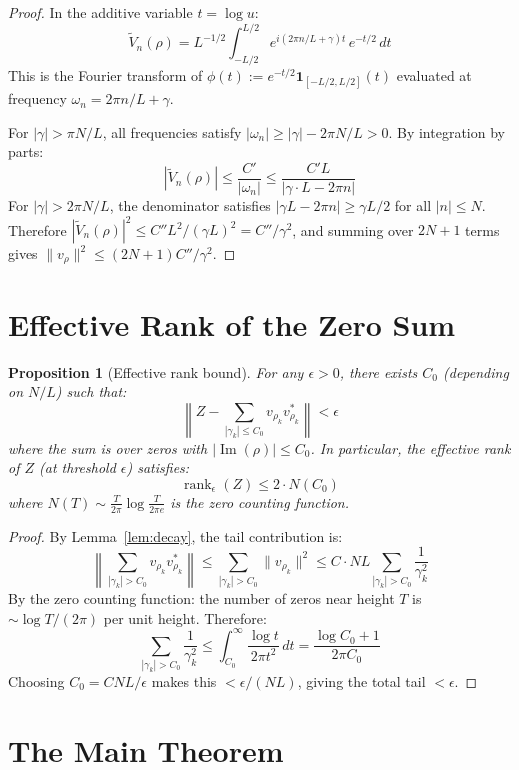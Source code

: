 \documentclass[11pt]{article}
\newtheorem{proposition}{Proposition}
\begin{document}
\begin{proof}
In the additive variable $t = \log u$:
\[
\tilde{V}_n(\rho) = L^{-1/2} \int_{-L/2}^{L/2} e^{i(2\pi n/L + \gamma)t}\, e^{-t/2}\, dt
\]
This is the Fourier transform of $\phi(t) := e^{-t/2}\mathbf{1}_{[-L/2,L/2]}(t)$ evaluated at frequency $\omega_n = 2\pi n/L + \gamma$.

For $|\gamma| > \pi N/L$, all frequencies satisfy $|\omega_n| \geq |\gamma| - 2\pi N/L > 0$. By integration by parts:
\[
|\tilde{V}_n(\rho)| \leq \frac{C'}{|\omega_n|} \leq \frac{C'L}{|\gamma \cdot L - 2\pi n|}
\]
For $|\gamma| > 2\pi N/L$, the denominator satisfies $|\gamma L - 2\pi n| \geq \gamma L/2$ for all $|n| \leq N$. Therefore $|\tilde{V}_n(\rho)|^2 \leq C''L^2/(\gamma L)^2 = C''/\gamma^2$, and summing over $2N+1$ terms gives $\|v_\rho\|^2 \leq (2N+1)C''/\gamma^2$.
\end{proof}

\section{Effective Rank of the Zero Sum}

\begin{proposition}[Effective rank bound]\label{prop:rank}
For any $\epsilon > 0$, there exists $C_0$ (depending on $N/L$) such that:
\[
\left\| Z - \sum_{|\gamma_k| \leq C_0} v_{\rho_k} v_{\rho_k}^* \right\| < \epsilon
\]
where the sum is over zeros with $|\operatorname{Im}(\rho)| \leq C_0$. In particular, the effective rank of $Z$ (at threshold $\epsilon$) satisfies:
\[
\operatorname{rank}_\epsilon(Z) \leq 2 \cdot N(C_0)
\]
where $N(T) \sim \frac{T}{2\pi}\log\frac{T}{2\pi e}$ is the zero counting function.
\end{proposition}

\begin{proof}
By Lemma~\ref{lem:decay}, the tail contribution is:
\[
\left\|\sum_{|\gamma_k| > C_0} v_{\rho_k} v_{\rho_k}^*\right\| \leq \sum_{|\gamma_k| > C_0} \|v_{\rho_k}\|^2 \leq C \cdot NL \sum_{|\gamma_k| > C_0} \frac{1}{\gamma_k^2}
\]
By the zero counting function: the number of zeros near height $T$ is $\sim \log T/(2\pi)$ per unit height. Therefore:
\[
\sum_{|\gamma_k| > C_0} \frac{1}{\gamma_k^2} \leq \int_{C_0}^\infty \frac{\log t}{2\pi t^2}\,dt = \frac{\log C_0 + 1}{2\pi C_0}
\]
Choosing $C_0 = CNL/\epsilon$ makes this $< \epsilon/(NL)$, giving the total tail $< \epsilon$.
\end{proof}

\section{The Main Theorem}
\end{document}
